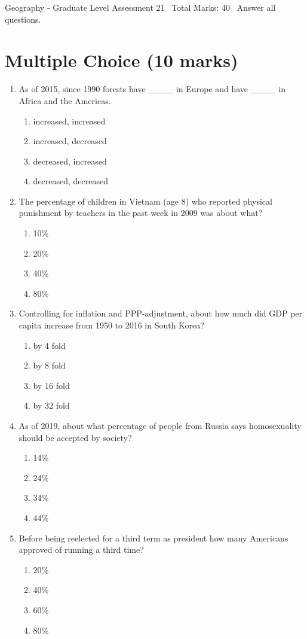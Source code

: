\documentclass[12pt]{article}
\begin{document}
\begin{center}
Geography - Graduate Level Assessment 21 \
Total Marks: 40 \
Answer all questions.
\end{center}

\section*{Multiple Choice (10 marks)}
\begin{enumerate}[label=\arabic*.]
\item As of 2015, since 1990 forests have \_\_\_\_ in Europe and have \_\_\_\_ in Africa and the Americas.
\begin{enumerate}[label=(\alph*)]
    \item increased, increased
    \item increased, decreased
    \item decreased, increased
    \item decreased, decreased
\end{enumerate}
\item The percentage of children in Vietnam (age 8) who reported physical punishment by teachers in the past week in 2009 was about what?
\begin{enumerate}[label=(\alph*)]
    \item 10\%
    \item 20\%
    \item 40\%
    \item 80\%
\end{enumerate}
\item Controlling for inflation and PPP-adjustment, about how much did GDP per capita increase from 1950 to 2016 in South Korea?
\begin{enumerate}[label=(\alph*)]
    \item by 4 fold
    \item by 8 fold
    \item by 16 fold
    \item by 32 fold
\end{enumerate}
\item As of 2019, about what percentage of people from Russia says homosexuality should be accepted by society?
\begin{enumerate}[label=(\alph*)]
    \item 14\%
    \item 24\%
    \item 34\%
    \item 44\%
\end{enumerate}
\item Before being reelected for a third term as president how many Americans approved of running a third time?
\begin{enumerate}[label=(\alph*)]
    \item 20\%
    \item 40\%
    \item 60\%
    \item 80\%
\end{enumerate}
\end{enumerate}
\end{document}
